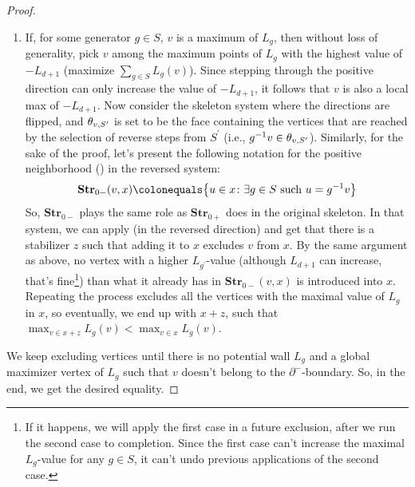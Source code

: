 \begin{proof}
\begin{enumerate}
      \item If, for some generator $g \in S$, $v$ is a maximum of $L_{g}$, then without loss of generality, pick $v$ among the maximum points of $L_{g}$ with the highest value of $-L_{d+1}$ (maximize $\sum_{g \in S} L_{g}(v)$). Since stepping through the positive direction can only increase the value of $-L_{d+1}$, it follows that $v$ is also a local max of $-L_{d+1}$.
        Now consider the skeleton system where the directions are flipped, and $\theta_{v ,S^{\prime}}{}$ is set to be the face containing the vertices that are reached by the selection of reverse steps from $S^{\prime}$ (i.e., $g^{-1}v \in \theta_{v ,S^{\prime}}{}$). Similarly, for the sake of the proof, let's present the following notation for the positive neighborhood () in the reversed system:
        \begin{equation*}
          \begin{split}
            \textbf{Str}_{0-}(v,x) \colonequals \big\{ u \in x \colon \exists g \in S \text{ such }  u = g^{-1}v   \big\}
          \end{split}
        \end{equation*}
So, $\textbf{Str}_{0-}$ plays the same role as $\textbf{Str}_{0+}$ does in the original skeleton.
In that system, we can apply  (in the reversed direction) and get that there is a stabilizer $z$ such that adding it to $x$ excludes $v$ from $x$. By the same argument as above, no vertex with a higher $L_{g^{\prime}}$-value (although $L_{d+1}$ can increase, that's fine\footnote{ If it happens, we will apply the first case in a future exclusion, after we run the second case to completion. Since the first case can't increase the maximal $L_{g}$-value for any $g\in S$, it can't undo previous applications of the second case. }) than what it already has in $\textbf{Str}_{0-}(v,x)$ is introduced into $x$. Repeating the process excludes all the vertices with the maximal value of $L_{g}$ in $x$, so eventually, we end up with $x+z$, such that $\max_{v \in x +z }L_{g}(v) < \max_{v \in x}L_{g}(v)$.
  \end{enumerate}
We keep excluding vertices until there is no potential wall $L_{g}$ and a global maximizer vertex of $L_{g}$ such that $v$ doesn't belong to the $\partial^{-}$-boundary. So, in the end, we get the desired equality.

\end{proof}





